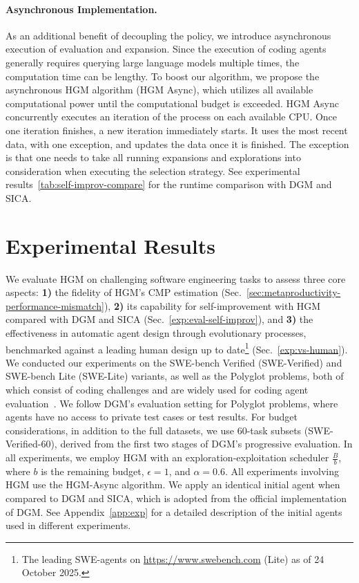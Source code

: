 \documentclass{article}
\begin{document}
\paragraph{Asynchronous Implementation.}\label{method:async-parallel}
As an additional benefit of decoupling the policy, we introduce asynchronous execution of evaluation and expansion. Since the execution of coding agents generally requires querying large language models multiple times, the computation time can be lengthy. To boost our algorithm, we propose the asynchronous HGM algorithm (HGM Async), which utilizes all available computational power until the computational budget is exceeded. HGM Async concurrently executes an iteration of the process on each available CPU. Once one iteration finishes, a new iteration immediately starts. It uses the most recent data, with one exception, and updates the data once it is finished. The exception is that one needs to take all running expansions and explorations into consideration when executing the selection strategy. 
See experimental results~\ref{tab:self-improv-compare} for the runtime comparison with DGM and SICA. 






\section{Experimental Results}
\label{sec:exp}
We evaluate HGM on challenging software engineering tasks to assess three core aspects: \textbf{1)} the fidelity of HGM’s $\mathrm{CMP}$ estimation (Sec.~\ref{sec:metaproductivity-performance-mismatch}), \textbf{2)} its capability for self-improvement with HGM compared with DGM and SICA (Sec.~\ref{exp:eval-self-improv}), and \textbf{3)} the effectiveness in automatic agent design through evolutionary processes, benchmarked against a leading human design up to date\footnote{The leading SWE-agents on \url{https://www.swebench.com} (Lite) as of 24 October 2025.} (Sec.~\ref{exp:vs-human}). We conducted our experiments on the SWE-bench Verified (SWE-Verified) and SWE-bench Lite (SWE-Lite) variants, as well as the Polyglot problems, both of which consist of coding challenges and are widely used for coding agent evaluation~\citep{xia2025demystifying,zhang2024autocoderover,zhang2025swe}. We follow DGM's evaluation setting for Polyglot problems, where agents have no access to private test cases or test results.  For budget considerations, in addition to the full datasets, we use 60-task subsets (SWE-Verified-60), derived from the first two stages of DGM’s progressive evaluation. In all experiments, we employ HGM with an exploration-exploitation scheduler $\frac{B}{b}$, where $b$ is the remaining budget, $\epsilon = 1$, and $\alpha = 0.6$. All experiments involving HGM use the HGM‑Async algorithm.
We apply an identical initial agent when compared to DGM and SICA, which is adopted from the official implementation of DGM. See Appendix~\ref{app:exp} for a detailed description of the initial agents used in different experiments.
\end{document}
